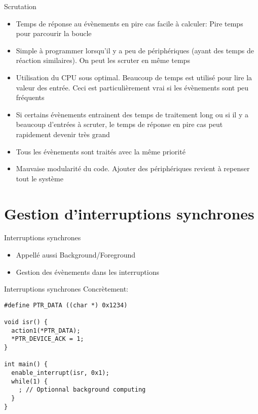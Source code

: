 \begin{frame}{Scrutation}
  \begin{itemize}
  \item Temps de réponse au  évènements en pire cas facile à calculer:
    Pire temps pour parcourir la boucle
  \item Simple à programmer lorsqu'il  y a peu de périphériques (ayant
    des temps  de réaction  similaires). On peut  les scruter  en même
    temps
  \item Utilisation du CPU sous optimal. Beaucoup de temps est utilisé
    pour lire la valeur des  entrée. Ceci est particulièrement vrai si
    les évènements sont peu fréquents
  \item Si certains évènements entrainent des temps de traitement long
    ou si il y a beaucoup  d'entrées à scruter, le temps de réponse en
    pire cas peut rapidement devenir très grand
  \item Tous les évènements sont traités avec la même priorité
  \item  Mauvaise modularité  du code.  Ajouter des périphériques
    revient à repenser tout le système
  \end{itemize}
\end{frame}

\section{Gestion d'interruptions synchrones}

\begin{frame}{Interruptions synchrones}
  \begin{itemize}
  \item Appellé aussi Background/Foreground
  \item Gestion des évènements dans les interruptions
  \end{itemize}
  \begin{center}
  \end{center}
\end{frame}

\begin{frame}[fragile]{Interruptions synchrones}
  Concrètement:
  \begin{lstlisting}
#define PTR_DATA ((char *) 0x1234)

void isr() {
  action1(*PTR_DATA);
  *PTR_DEVICE_ACK = 1;
}

int main() {
  enable_interrupt(isr, 0x1);
  while(1) {
    ; // Optionnal background computing
  }
}
  \end{lstlisting}
\end{frame}

